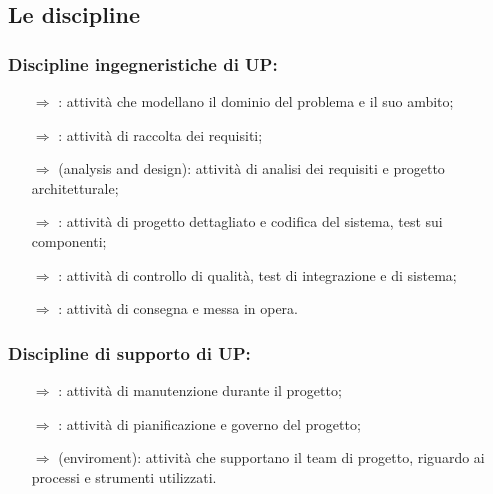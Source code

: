 \subsection{Le discipline}



\subsubsection{Discipline ingegneristiche di UP:}

\begin{itemize}
    \item [$\Rightarrow$] : attività che 
    modellano il dominio del problema e il suo ambito;
    \item [$\Rightarrow$] : attività di raccolta dei requisiti;
    \item [$\Rightarrow$]  (analysis and design): attività di analisi dei requisiti
    e progetto architetturale;
    \item [$\Rightarrow$] : attività di progetto dettagliato e codifica del sistema, test sui componenti;
    \item [$\Rightarrow$] : attività di controllo di qualità, test di integrazione e di sistema;
    \item [$\Rightarrow$] : attività di consegna e messa in opera.
\end{itemize}

\subsubsection{Discipline di supporto di UP:}

\begin{itemize}
    \item [$\Rightarrow$] : attività di manutenzione durante il progetto;
    \item [$\Rightarrow$] : attività di pianificazione e governo del progetto;
    \item [$\Rightarrow$]  (enviroment): attività che supportano il team di progetto, riguardo ai processi e strumenti utilizzati.
\end{itemize}

